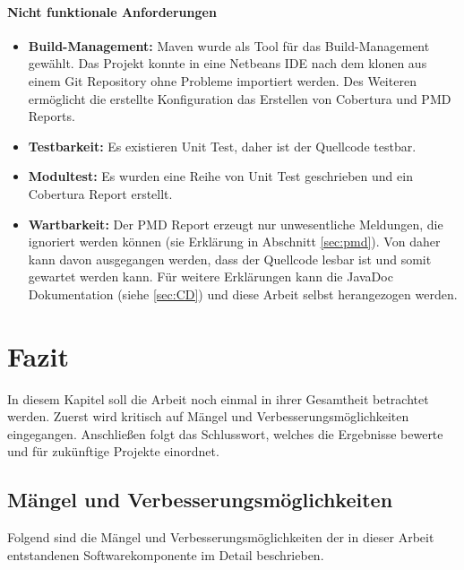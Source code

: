 \documentclass[a4paper]{article}
\begin{document}
	\paragraph{Nicht funktionale Anforderungen}
	\begin{itemize}
		\item \textbf{Build-Management:} Maven wurde als Tool für das
		Build-Management gewählt. Das Projekt konnte in eine Netbeans IDE
		nach dem klonen aus einem Git Repository ohne Probleme importiert werden.
		Des Weiteren ermöglicht die erstellte Konfiguration das Erstellen von
		Cobertura und PMD Reports. 
		\item \textbf{Testbarkeit:} Es existieren Unit Test, daher ist der Quellcode
		testbar.
		\item \textbf{Modultest:} Es wurden eine Reihe von Unit Test geschrieben und
		ein Cobertura Report erstellt.
		\item \textbf{Wartbarkeit:} Der PMD Report erzeugt nur unwesentliche
		Meldungen, die ignoriert werden können (sie Erklärung in Abschnitt
		\ref{sec:pmd}). Von daher kann davon ausgegangen werden, dass der Quellcode
		lesbar ist und somit gewartet werden kann. Für weitere Erklärungen kann
		die JavaDoc Dokumentation (siehe \autoref{sec:CD}) und diese Arbeit selbst
		herangezogen werden.
	\end{itemize} 
	
	\newpage
	\section{Fazit}
	
	In diesem Kapitel soll die Arbeit noch einmal in ihrer Gesamtheit betrachtet
	werden. Zuerst wird kritisch auf Mängel und Verbesserungsmöglichkeiten
	eingegangen. Anschließen folgt das Schlusswort, welches die Ergebnisse 
	bewerte und für zukünftige Projekte einordnet.
	
	\subsection{Mängel und Verbesserungsmöglichkeiten}
	
	Folgend sind die Mängel und Verbesserungsmöglichkeiten der in dieser Arbeit
	entstandenen Softwarekomponente im Detail beschrieben.
	
\end{document}
